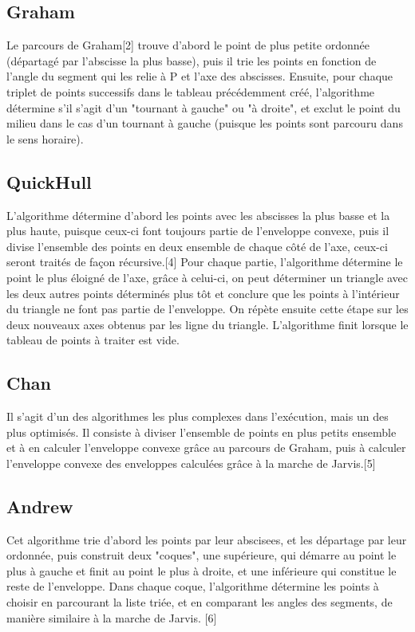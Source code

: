 \documentclass[final]{beamer}
\begin{document}
\begin{frame}[t]
\begin{multicols}{3}
\subsection{Graham}
Le parcours de Graham[2] trouve d'abord le point de plus petite ordonnée (départagé par l'abscisse la plus basse), puis il trie les points en fonction de l'angle du segment qui les relie à P et l'axe des abscisses. Ensuite, pour chaque triplet de points successifs dans le tableau précédemment créé, l'algorithme détermine s'il s'agit d'un "tournant à gauche" ou "à droite", et exclut le point du milieu dans le cas d'un tournant à gauche (puisque les points sont parcouru dans le sens horaire).

\subsection{QuickHull}
L'algorithme détermine d'abord les points avec les abscisses la plus basse et la plus haute, puisque ceux-ci font toujours partie de l'enveloppe convexe, puis il divise l'ensemble des points en deux ensemble de chaque côté de l'axe, ceux-ci seront traités de façon récursive.[4] Pour chaque partie, l'algorithme détermine le point le plus éloigné de l'axe, grâce à celui-ci, on peut déterminer un triangle avec les deux autres points déterminés plus tôt et conclure que les points à l'intérieur du triangle ne font pas partie de l'enveloppe. On répète ensuite cette étape sur les deux nouveaux axes obtenus par les ligne du triangle. L'algorithme finit lorsque le tableau de points à traiter est vide.

\subsection{Chan}

Il s'agit d'un des algorithmes les plus complexes dans l'exécution, mais un des plus optimisés. Il consiste à diviser l'ensemble de points en plus petits ensemble et à en calculer l'enveloppe convexe grâce au parcours de Graham, puis à calculer l'enveloppe convexe des enveloppes calculées grâce à la marche de Jarvis.[5]

\subsection{Andrew}
Cet algorithme trie d'abord les points par leur abscisees, et les départage par leur ordonnée, puis construit deux "coques", une supérieure, qui démarre au point le plus à gauche et finit au point le plus à droite, et une inférieure qui constitue le reste de l'enveloppe. Dans chaque coque, l'algorithme détermine les points à choisir en parcourant la liste triée, et en comparant les angles des segments, de manière similaire à la marche de Jarvis. [6]


\end{multicols}
\end{frame}
\end{document}
